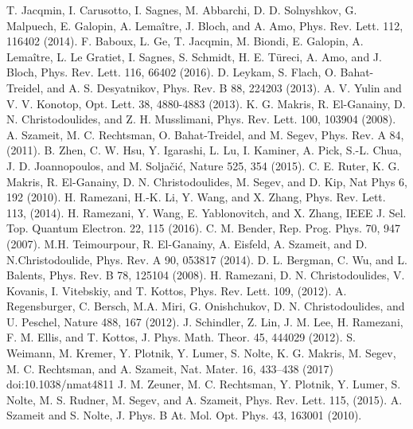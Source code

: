 \documentclass[aps,prl,twocolumn,showpacs,groupedaddress,amsmath,amssymb]{revtex4}
\begin{document}
\begin{thebibliography}{99}
	T. Jacqmin, I. Carusotto, I. Sagnes, M. Abbarchi, D. D. Solnyshkov, G. Malpuech, E. Galopin, A. Lema\^{i}tre, J. Bloch, and A. Amo, Phys. Rev. Lett. 112, 116402 (2014).
	F. Baboux, L. Ge, T. Jacqmin, M. Biondi, E. Galopin, A. Lemaître, L. Le Gratiet, I. Sagnes, S. Schmidt, H. E. T\"{u}reci, A. Amo, and J. Bloch, Phys. Rev. Lett. 116, 66402 (2016).
	D. Leykam, S. Flach, O. Bahat-Treidel, and A. S. Desyatnikov, Phys. Rev. B 88, 224203 (2013).
 A. V. Yulin and V. V. Konotop,  Opt. Lett. 38, 4880-4883 (2013).
	K. G. Makris, R. El-Ganainy, D. N. Christodoulides, and Z. H. Musslimani, Phys. Rev. Lett. 100, 103904 (2008).
	A. Szameit, M. C. Rechtsman, O. Bahat-Treidel, and M. Segev, Phys. Rev. A 84, (2011).
	B. Zhen, C. W. Hsu, Y. Igarashi, L. Lu, I. Kaminer, A. Pick, S.-L. Chua, J. D. Joannopoulos, and M. Solja\v{c}i\'{c}, Nature 525, 354 (2015).
	C. E. Ruter, K. G. Makris, R. El-Ganainy, D. N. Christodoulides, M. Segev, and D. Kip, Nat Phys 6, 192 (2010).
	H. Ramezani, H.-K. Li, Y. Wang, and X. Zhang, Phys. Rev. Lett. 113, (2014).
	H. Ramezani, Y. Wang, E. Yablonovitch, and X. Zhang, IEEE J. Sel. Top. Quantum Electron. 22, 115 (2016).
	C. M. Bender, Rep. Prog. Phys. 70, 947 (2007).
	M.H. Teimourpour, R. El-Ganainy, A. Eisfeld, A. Szameit, and D. N.Christodoulide, Phys. Rev. A 90, 053817 (2014).
	D. L. Bergman, C. Wu, and L. Balents, Phys. Rev. B 78, 125104 (2008).
	H. Ramezani, D. N. Christodoulides, V. Kovanis, I. Vitebskiy, and T. Kottos, Phys. Rev. Lett. 109, (2012).
	A. Regensburger, C. Bersch, M.A. Miri, G. Onishchukov, D. N. Christodoulides, and U. Peschel, Nature 488, 167 (2012).
	J. Schindler, Z. Lin, J. M. Lee, H. Ramezani, F. M. Ellis, and T. Kottos, J. Phys. Math. Theor. 45, 444029 (2012).
	S. Weimann, M. Kremer, Y. Plotnik, Y. Lumer, S. Nolte, K. G. Makris, M. Segev, M. C. Rechtsman, and A. Szameit, Nat. Mater. 16, 433–438 (2017) doi:10.1038/nmat4811
	J. M. Zeuner, M. C. Rechtsman, Y. Plotnik, Y. Lumer, S. Nolte, M. S. Rudner, M. Segev, and A. Szameit, Phys. Rev. Lett. 115, (2015).
	A. Szameit and S. Nolte, J. Phys. B At. Mol. Opt. Phys. 43, 163001 (2010).

\end{thebibliography}
\end{document}
